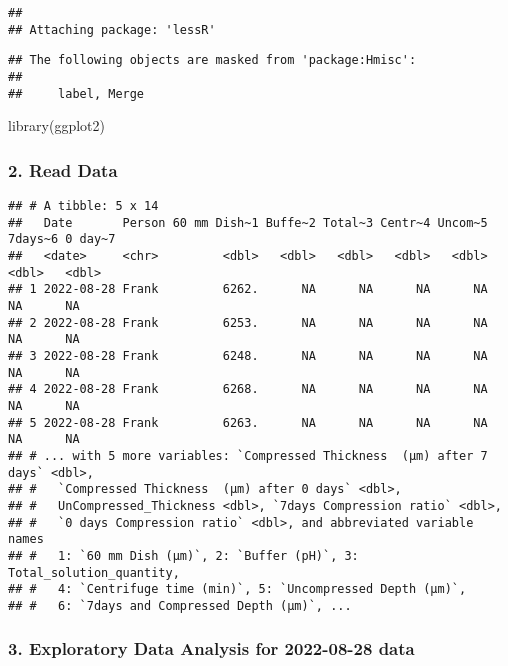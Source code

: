 \documentclass[
]{article}
\newenvironment{Shaded}{\begin{snugshade}}{\end{snugshade}}
\newcommand{\FunctionTok}[1]{\textcolor[rgb]{0.00,0.00,0.00}{#1}}
\newcommand{\NormalTok}[1]{#1}
\begin{document}
\begin{verbatim}
## 
## Attaching package: 'lessR'
\end{verbatim}

\begin{verbatim}
## The following objects are masked from 'package:Hmisc':
## 
##     label, Merge
\end{verbatim}

\begin{Shaded}
\begin{Highlighting}[]
\FunctionTok{library}\NormalTok{(ggplot2)}
\end{Highlighting}
\end{Shaded}

\hypertarget{read-data}{%
\subsubsection{2. Read Data}\label{read-data}}

\begin{verbatim}
## # A tibble: 5 x 14
##   Date       Person 60 mm Dish~1 Buffe~2 Total~3 Centr~4 Uncom~5 7days~6 0 day~7
##   <date>     <chr>         <dbl>   <dbl>   <dbl>   <dbl>   <dbl>   <dbl>   <dbl>
## 1 2022-08-28 Frank         6262.      NA      NA      NA      NA      NA      NA
## 2 2022-08-28 Frank         6253.      NA      NA      NA      NA      NA      NA
## 3 2022-08-28 Frank         6248.      NA      NA      NA      NA      NA      NA
## 4 2022-08-28 Frank         6268.      NA      NA      NA      NA      NA      NA
## 5 2022-08-28 Frank         6263.      NA      NA      NA      NA      NA      NA
## # ... with 5 more variables: `Compressed Thickness  (μm) after 7 days` <dbl>,
## #   `Compressed Thickness  (μm) after 0 days` <dbl>,
## #   UnCompressed_Thickness <dbl>, `7days Compression ratio` <dbl>,
## #   `0 days Compression ratio` <dbl>, and abbreviated variable names
## #   1: `60 mm Dish (μm)`, 2: `Buffer (pH)`, 3: Total_solution_quantity,
## #   4: `Centrifuge time (min)`, 5: `Uncompressed Depth (μm)`,
## #   6: `7days and Compressed Depth (μm)`, ...
\end{verbatim}

\hypertarget{exploratory-data-analysis-for-2022-08-28-data}{%
\subsubsection{3. Exploratory Data Analysis for 2022-08-28
data}\label{exploratory-data-analysis-for-2022-08-28-data}}
\end{document}
